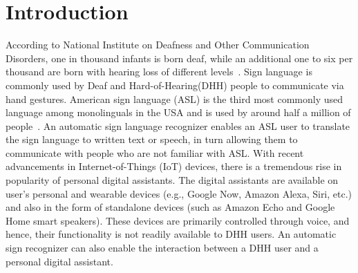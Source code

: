 \documentclass[10pt,twocolumn,letterpaper]{article}
\begin{document}
\section{Introduction}

According to National Institute on Deafness and Other Communication Disorders, one in thousand infants is born deaf, while an additional one to six per thousand are born with hearing loss of different levels~\cite{3072291}. Sign language is commonly used by Deaf and Hard-of-Hearing(DHH) people to communicate via hand gestures. American sign language (ASL) is the third most commonly used language among monolinguals in the USA and is used by around half a million of people~\cite{sign_lang_study}. An automatic sign language recognizer enables an ASL user to translate the sign language to written text or speech, in turn allowing them to communicate with people who are not familiar with ASL. With recent advancements in Internet-of-Things (IoT) devices, there is a tremendous rise in popularity of personal digital assistants. The digital assistants are available on user's personal and wearable devices (e.g., Google Now, Amazon Alexa, Siri, etc.) and also in the form of standalone devices (such as Amazon Echo and Google Home smart speakers). These devices are primarily controlled through voice, and hence, their functionality is not readily available to DHH users. An automatic sign recognizer can also enable the interaction between a DHH user and a personal digital assistant. 

\end{document}
